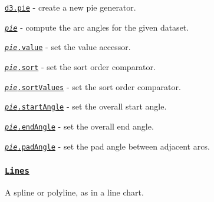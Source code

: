 \begin{DoxyItemize}
\item \href{https://github.com/d3/d3-shape/blob/master/README.md#pie}{\tt d3.\+pie} -\/ create a new pie generator.
\item \href{https://github.com/d3/d3-shape/blob/master/README.md#_pie}{\tt {\itshape pie}} -\/ compute the arc angles for the given dataset.
\item \href{https://github.com/d3/d3-shape/blob/master/README.md#pie_value}{\tt {\itshape pie}.value} -\/ set the value accessor.
\item \href{https://github.com/d3/d3-shape/blob/master/README.md#pie_sort}{\tt {\itshape pie}.sort} -\/ set the sort order comparator.
\item \href{https://github.com/d3/d3-shape/blob/master/README.md#pie_sortValues}{\tt {\itshape pie}.sort\+Values} -\/ set the sort order comparator.
\item \href{https://github.com/d3/d3-shape/blob/master/README.md#pie_startAngle}{\tt {\itshape pie}.start\+Angle} -\/ set the overall start angle.
\item \href{https://github.com/d3/d3-shape/blob/master/README.md#pie_endAngle}{\tt {\itshape pie}.end\+Angle} -\/ set the overall end angle.
\item \href{https://github.com/d3/d3-shape/blob/master/README.md#pie_padAngle}{\tt {\itshape pie}.pad\+Angle} -\/ set the pad angle between adjacent arcs.
\end{DoxyItemize}

\subsubsection*{\href{https://github.com/d3/d3-shape/blob/master/README.md#lines}{\tt Lines}}

A spline or polyline, as in a line chart.


